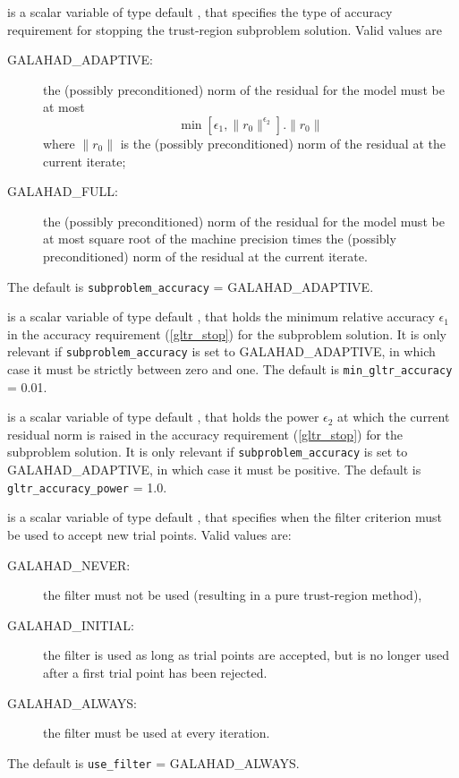 \documentclass{galahad}
\newcommand{\sym}{\sf\small}
\begin{document}
\begin{description}
 is a scalar variable of type default \integer,
that specifies the type of accuracy requirement for stopping the trust-region
subproblem solution. Valid values are
\begin{description}
\item[\sym GALAHAD\_ADAPTIVE:] the (possibly preconditioned) norm of the
residual for the model must be at most 
\begin{equation}\label{gltr_stop}
\min\left[\epsilon_1,\| r_0 \|^{\epsilon_2}\right] . \|r_0\|
\end{equation}
where $\|r_0\|$ is the (possibly preconditioned) norm of the residual at the
current iterate; 
\item[\sym GALAHAD\_FULL:] the (possibly preconditioned) norm of the residual
for the model must be at most square root of the machine precision times
the (possibly preconditioned) norm of the residual at the current iterate.
\end{description}
The default is {\tt subproblem\_accuracy} = {\sym GALAHAD\_ADAPTIVE}.

 is a scalar variable of type default \realdp, that
holds the minimum relative accuracy $\epsilon_1$ in the accuracy
requirement (\ref{gltr_stop}) for the subproblem solution.
It is only relevant if {\tt subproblem\_accuracy} is set
to {\sym GALAHAD\_ADAPTIVE}, in which case it must be strictly between zero
and one. 
The default is {\tt min\_gltr\_accuracy} = 0.01.

 is a scalar variable of type default \realdp, that
holds the power $\epsilon_2$ at which the current residual norm is raised in
the accuracy requirement (\ref{gltr_stop}) for the subproblem solution. 
It is only relevant if {\tt subproblem\_accuracy} is set
to {\sym GALAHAD\_ADAPTIVE}, in which case it must be positive.
The default is {\tt gltr\_accuracy\_power} = 1.0.

 is a scalar variable of type default \integer, that
specifies when the filter criterion must be used to accept new trial points.
Valid values are:
\begin{description}
\item[\sym GALAHAD\_NEVER:] the filter must not be used (resulting in a pure
trust-region method),
\item[\sym GALAHAD\_INITIAL:] the filter is used as long as trial points are
accepted, but is no longer used after a first trial point has been rejected.
\item[\sym GALAHAD\_ALWAYS:] the filter must be used at every iteration.
\end{description}
The default is {\tt use\_filter} = {\sym GALAHAD\_ALWAYS}.


\end{description}
\end{document}
